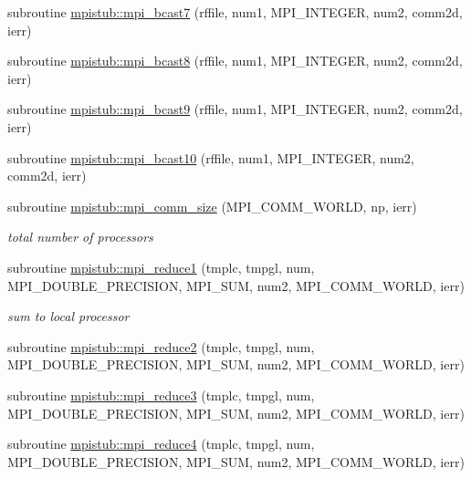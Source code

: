 \begin{DoxyCompactItemize}
\item 
subroutine \mbox{\hyperlink{namespacempistub_a5557aded89a597293b1fda3138bce902}{mpistub\+::mpi\+\_\+bcast7}} (rffile, num1, M\+P\+I\+\_\+\+I\+N\+T\+E\+G\+ER, num2, comm2d, ierr)
\item 
subroutine \mbox{\hyperlink{namespacempistub_a8a78645877ad94bcd0dbb6240b20f15a}{mpistub\+::mpi\+\_\+bcast8}} (rffile, num1, M\+P\+I\+\_\+\+I\+N\+T\+E\+G\+ER, num2, comm2d, ierr)
\item 
subroutine \mbox{\hyperlink{namespacempistub_ab1b85417ae697305c4b8ede7fa7d5f26}{mpistub\+::mpi\+\_\+bcast9}} (rffile, num1, M\+P\+I\+\_\+\+I\+N\+T\+E\+G\+ER, num2, comm2d, ierr)
\item 
subroutine \mbox{\hyperlink{namespacempistub_a75581dd8d19054f24cda24cb93a956a3}{mpistub\+::mpi\+\_\+bcast10}} (rffile, num1, M\+P\+I\+\_\+\+I\+N\+T\+E\+G\+ER, num2, comm2d, ierr)
\item 
subroutine \mbox{\hyperlink{namespacempistub_a188b67a76569dcb918a27f48018e6baf}{mpistub\+::mpi\+\_\+comm\+\_\+size}} (M\+P\+I\+\_\+\+C\+O\+M\+M\+\_\+\+W\+O\+R\+LD, np, ierr)
\begin{DoxyCompactList}\small\item\em total number of processors \end{DoxyCompactList}\item 
subroutine \mbox{\hyperlink{namespacempistub_a6ba478c1e620c237eb85776943b327ad}{mpistub\+::mpi\+\_\+reduce1}} (tmplc, tmpgl, num, M\+P\+I\+\_\+\+D\+O\+U\+B\+L\+E\+\_\+\+P\+R\+E\+C\+I\+S\+I\+ON, M\+P\+I\+\_\+\+S\+UM, num2, M\+P\+I\+\_\+\+C\+O\+M\+M\+\_\+\+W\+O\+R\+LD, ierr)
\begin{DoxyCompactList}\small\item\em sum to local processor \end{DoxyCompactList}\item 
subroutine \mbox{\hyperlink{namespacempistub_a1b64afd5481e729d54724f7427b4a32f}{mpistub\+::mpi\+\_\+reduce2}} (tmplc, tmpgl, num, M\+P\+I\+\_\+\+D\+O\+U\+B\+L\+E\+\_\+\+P\+R\+E\+C\+I\+S\+I\+ON, M\+P\+I\+\_\+\+S\+UM, num2, M\+P\+I\+\_\+\+C\+O\+M\+M\+\_\+\+W\+O\+R\+LD, ierr)
\item 
subroutine \mbox{\hyperlink{namespacempistub_a781c5f26f7ee9bdffdc195be7eaa07ef}{mpistub\+::mpi\+\_\+reduce3}} (tmplc, tmpgl, num, M\+P\+I\+\_\+\+D\+O\+U\+B\+L\+E\+\_\+\+P\+R\+E\+C\+I\+S\+I\+ON, M\+P\+I\+\_\+\+S\+UM, num2, M\+P\+I\+\_\+\+C\+O\+M\+M\+\_\+\+W\+O\+R\+LD, ierr)
\item 
subroutine \mbox{\hyperlink{namespacempistub_ad1156be68f1c3c3dd3d844d6d4cee160}{mpistub\+::mpi\+\_\+reduce4}} (tmplc, tmpgl, num, M\+P\+I\+\_\+\+D\+O\+U\+B\+L\+E\+\_\+\+P\+R\+E\+C\+I\+S\+I\+ON, M\+P\+I\+\_\+\+S\+UM, num2, M\+P\+I\+\_\+\+C\+O\+M\+M\+\_\+\+W\+O\+R\+LD, ierr)

\end{DoxyCompactItemize}
